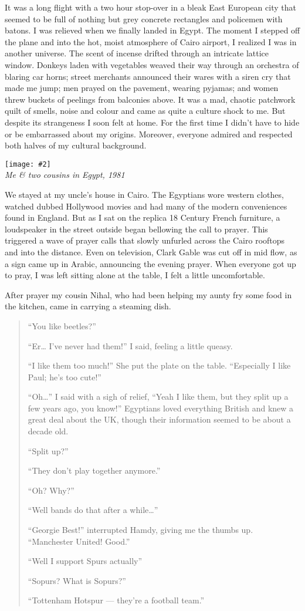 \documentclass[12pt]{memoir}
\newcommand{\img}[3]{\begin{center}%
\texttt{[image: \#2]}\\{\small\em#3}%
\end{center}}
\begin{document}
It was a long flight with a two hour stop-over
in a bleak East European city that seemed to be full of nothing
but grey concrete rectangles and policemen with batons.
I was relieved when we finally landed in Egypt.
The moment I stepped off the plane and into the hot,
moist atmosphere of Cairo airport,
I realized I was in another universe.
The scent of incense drifted through an intricate lattice window.
Donkeys laden with vegetables weaved their way
through an orchestra of blaring car horns;
street merchants announced their wares with a siren cry that made me jump;
men prayed on the pavement, wearing pyjamas;
and women threw buckets of peelings from balconies above.
It was a mad, chaotic patchwork quilt of smells,
noise and colour and came as quite a culture shock to me.
But despite its strangeness I soon felt at home.
For the first time I didn’t have to hide or be embarrassed about my origins.
Moreover, everyone admired and respected both halves of my cultural background.

\img{scale=0.3}{Hassan_Cousins.jpg}
{Me \& two cousins in Egypt, 1981}

We stayed at my uncle’s house in Cairo.
The Egyptians wore western clothes,
watched dubbed Hollywood movies
and had many of the modern conveniences found in England.
But as I sat on the replica 18 Century French furniture,
a loudspeaker in the street outside began bellowing the call to prayer.
This triggered a wave of prayer calls
that slowly unfurled across the Cairo rooftops and into the distance.
Even on television, Clark Gable was cut off in mid flow,
as a sign came up in Arabic, announcing the evening prayer.
When everyone got up to pray,
I was left sitting alone at the table,
I felt a little uncomfortable.

After prayer my cousin Nihal,
who had been helping my aunty fry some food in the kitchen,
came in carrying a steaming dish.

\begin{quote}
“You like beetles?”

“Er… I’ve never had them!” I said, feeling a little queasy.

“I like them too much!”
She put the plate on the table.
“Especially I like Paul; he’s too cute!”

“Oh…” I said with a sigh of relief,
“Yeah I like them, but they split up a few years ago, you know!”
Egyptians loved everything British and knew a great deal about the UK,
though their information seemed to be about a decade old.

“Split up?”

“They don’t play together anymore.”

“Oh? Why?”

“Well bands do that after a while…”

“Georgie Best!” interrupted Hamdy, giving me the thumbs up.
“Manchester United! Good.”

“Well I support Spurs actually”

“Sopurs? What is Sopurs?”

“Tottenham Hotspur — they’re a football team.”
\end{quote}
\end{document}
